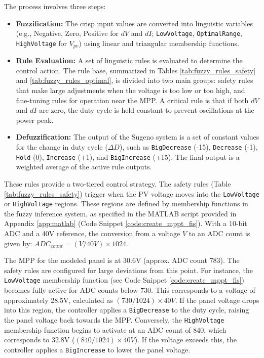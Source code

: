 \documentclass[a4paper,oneside,12pt]{report}
\numberwithin{equation}{chapter}
\begin{document}
The process involves three steps:
\begin{itemize}
    \item \textbf{Fuzzification:} The crisp input values are converted into linguistic variables (e.g., Negative, Zero, Positive for $dV$ and $dI$; \texttt{Low\textunderscore Voltage}, \texttt{Optimal\textunderscore Range}, \texttt{High\textunderscore Voltage} for $V_{pv}$) using linear and triangular membership functions.
    \item \textbf{Rule Evaluation:} A set of linguistic rules is evaluated to determine the control action. The rule base, summarized in Tables \ref{tab:fuzzy_rules_safety} and \ref{tab:fuzzy_rules_optimal}, is divided into two main groups: safety rules that make large adjustments when the voltage is too low or too high, and fine-tuning rules for operation near the MPP. A critical rule is that if both $dV$ and $dI$ are zero, the duty cycle is held constant to prevent oscillations at the power peak.
    \item \textbf{Defuzzification:} The output of the Sugeno system is a set of constant values for the change in duty cycle ($\Delta D$), such as \texttt{Big\textunderscore Decrease} (-15), \texttt{Decrease} (-1), \texttt{Hold} (0), \texttt{Increase} (+1), and \texttt{Big\textunderscore Increase} (+15). The final output is a weighted average of the active rule outputs.
\end{itemize}

These rules provide a two-tiered control strategy. The safety rules (Table \ref{tab:fuzzy_rules_safety}) trigger when the PV voltage moves into the \texttt{Low\textunderscore Voltage} or \texttt{High\textunderscore Voltage} regions. These regions are defined by membership functions in the fuzzy inference system, as specified in the MATLAB script provided in Appendix \ref{app:matlab} (Code Snippet \ref{code:create_mppt_fis}). With a 10-bit ADC and a 40V reference, the conversion from a voltage $V$ to an ADC count is given by: $ADC_{count} = (V / 40V) \times 1024$.

The MPP for the modeled panel is at 30.6V (approx. ADC count 783). The safety rules are configured for large deviations from this point. For instance, the \texttt{Low\textunderscore Voltage} membership function (see Code Snippet \ref{code:create_mppt_fis}) becomes fully active for ADC counts below 730. This corresponds to a voltage of approximately 28.5V, calculated as $(730 / 1024) \times 40V$. If the panel voltage drops into this region, the controller applies a \texttt{Big\textunderscore Decrease} to the duty cycle, raising the panel voltage back towards the MPP. Conversely, the \texttt{High\textunderscore Voltage} membership function begins to activate at an ADC count of 840, which corresponds to 32.8V ($(840 / 1024) \times 40V$). If the voltage exceeds this, the controller applies a \texttt{Big\textunderscore Increase} to lower the panel voltage.
\end{document}

